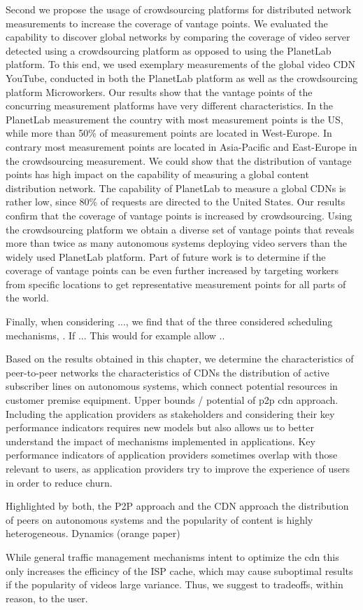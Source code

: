 Second we propose the usage of crowdsourcing platforms for distributed network measurements to increase the coverage of vantage points.
We evaluated the capability to discover global networks by comparing the coverage of video server detected using a crowdsourcing platform as opposed to using the PlanetLab platform.
To this end, we used exemplary measurements of the global video CDN YouTube, conducted in both the PlanetLab platform as well as the crowdsourcing platform Microworkers.
Our results show that the vantage points of the concurring measurement platforms have very different characteristics.
In the PlanetLab measurement the country with most measurement points is the US, while more than 50\% of measurement points are located in West-Europe.
In contrary most measurement points are located in Asia-Pacific and East-Europe in the crowdsourcing measurement.
We could show that the distribution of vantage points has high impact on the capability of measuring a global content distribution network.
The capability of PlanetLab to measure a global CDNs is rather low, since 80\% of requests are directed to the United States.
Our results confirm that the coverage of vantage points is increased by crowdsourcing.
Using the crowdsourcing platform we obtain a diverse set of vantage points that reveals more than twice as many autonomous systems deploying video servers than the widely used PlanetLab platform.
Part of future work is to determine if the coverage of vantage points can be even further increased by targeting workers from specific locations to get representative measurement points for all parts of the world.

Finally, when considering ..., we find that of the three considered scheduling mechanisms, .
If ...
This would for example allow ..

Based on the results obtained in this chapter, we determine
the characteristics of peer-to-peer networks
the characteristics of CDNs
the distribution of active subscriber lines on autonomous systems, which connect potential resources in customer premise equipment.
Upper bounds / potential of p2p cdn approach.
Including the application providers as stakeholders and considering their key performance indicators requires new models but also allows us to better understand the impact of mechanisms implemented in applications.
Key performance indicators of application providers sometimes overlap with those relevant to users, as application providers try to improve the experience of users in order to reduce churn.

Highlighted by both, the P2P approach and the CDN approach the distribution of peers on autonomous systems and the popularity of content is highly heterogeneous.
Dynamics (orange paper)

While general traffic management mechanisms intent to optimize the cdn
this only increases the efficincy of the ISP cache, which may cause suboptimal results if the popularity of videos large variance.
Thus, we suggest to  tradeoffs, within reason, to the user.
